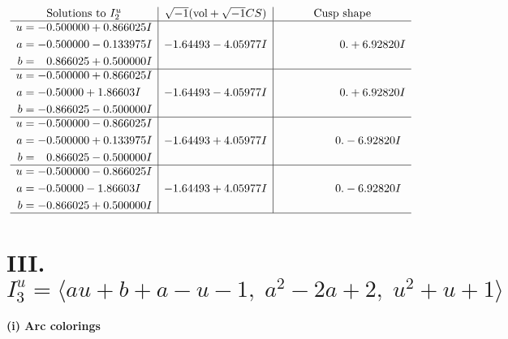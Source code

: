 \documentclass[1p]{elsarticle_modified}
\theoremstyle{definition}
\newcommand{\I}{\sqrt{-1}}
\begin{document}
$$\begin{array}{c|c|c}  
\text{Solutions to }I^u_{2}& \I (\text{vol} + \sqrt{-1}CS) & \text{Cusp shape}\\
 \hline 
\begin{aligned}
u &= -0.500000 + 0.866025 I \\
a &= -0.500000 - 0.133975 I \\
b &= \phantom{-}0.866025 + 0.500000 I\end{aligned}
 & -1.64493 - 4.05977 I & \phantom{-0.000000 -}0. + 6.92820 I \\ \hline\begin{aligned}
u &= -0.500000 + 0.866025 I \\
a &= -0.50000 + 1.86603 I \\
b &= -0.866025 - 0.500000 I\end{aligned}
 & -1.64493 - 4.05977 I & \phantom{-0.000000 -}0. + 6.92820 I \\ \hline\begin{aligned}
u &= -0.500000 - 0.866025 I \\
a &= -0.500000 + 0.133975 I \\
b &= \phantom{-}0.866025 - 0.500000 I\end{aligned}
 & -1.64493 + 4.05977 I & \phantom{-0.000000 } 0. - 6.92820 I \\ \hline\begin{aligned}
u &= -0.500000 - 0.866025 I \\
a &= -0.50000 - 1.86603 I \\
b &= -0.866025 + 0.500000 I\end{aligned}
 & -1.64493 + 4.05977 I & \phantom{-0.000000 } 0. - 6.92820 I\\
 \hline 
 \end{array}$$\newpage\newpage\renewcommand{\arraystretch}{1}
\centering \section*{III. $I^u_{3}= \langle a u+b+a- u-1,\;a^2-2 a+2,\;u^2+u+1 \rangle$}
\flushleft \textbf{(i) Arc colorings}\\
\end{document}
